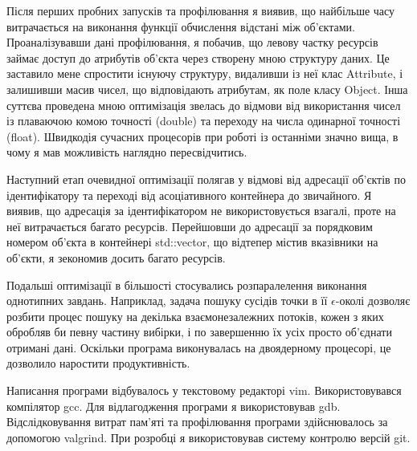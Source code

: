         Після перших пробних запусків та профілювання я виявив, що найбільше часу витрачається на виконання функції обчислення відстані між об'єктами. Проаналізувавши дані профілювання, я побачив, що левову частку ресурсів займає доступ до атрибутів об'єкта через створену мною структуру даних. Це заставило мене спростити існуючу структуру, видаливши із неї клас Attribute, і залишивши масив чисел, що відповідають атрибутам, як поле класу Object. Інша суттєва проведена мною оптимізація звелась до відмови від використання чисел із плаваючою комою точності (double) та переходу на числа одинарної точності (float). Швидкодія сучасних процесорів при роботі із останніми значно вища, в чому я мав можливість наглядно пересвідчитись.
        
        Наступний етап очевидної оптимізації полягав у відмові від адресації об'єктів по ідентифікатору та переході від асоціативного контейнера до звичайного. Я виявив, що адресація за ідентифікатором не використовується взагалі, проте на неї витрачається багато ресурсів. Перейшовши до адресації за порядковим номером об'єкта в контейнері std::vector, що відтепер містив вказівники на об'єкти, я зекономив досить багато ресурсів.
        
        Подальші оптимізації в більшості стосувались розпаралелення виконання однотипних завдань. Наприклад, задача пошуку сусідів точки в її $\epsilon$-околі дозволяє розбити процес пошуку на декілька взаємонезалежних потоків, кожен з яких обробляв би певну частину вибірки, і по завершенню їх усіх просто об'єднати отримані дані. Оскільки програма виконувалась на двоядерному процесорі, це дозволило наростити продуктивність.
        
        Написання програми відбувалось у текстовому редакторі vim. Використовувався компілятор gcc. Для відлагодження програми я використовував gdb. Відслідковування витрат пам'яті та профілювання програми здійснювалось за допомогою valgrind. При розробці я використовував систему контролю версій git.
